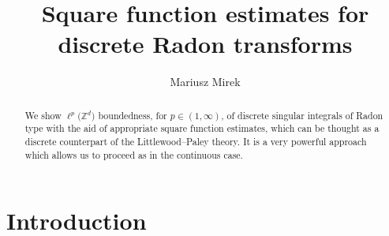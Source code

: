 \documentclass[a4paper,oneside]{amsart}
\title[Discrete operators of Radon types]
{Square function estimates for discrete
Radon transforms
}
\author{Mariusz Mirek}
\theoremstyle{plain}
\theoremstyle{definition}
\numberwithin{equation}{section}
\theoremstyle{plain}
\newcommand{\ZZ}{\mathbb{Z}}
\newcommand{\8}{\infty}
\begin{document}

\begin{abstract}
  We show $\ell^p\big(\ZZ^d\big)$ boundedness, for $p\in(1, \infty)$, of discrete
  singular integrals of Radon type with the aid of appropriate square
  function estimates, which can be thought as a discrete counterpart
  of the Littlewood--Paley theory. It is a  very powerful approach which
  allows us to proceed as in the continuous case. 
\end{abstract}

\maketitle

\section{Introduction}
\end{document}
